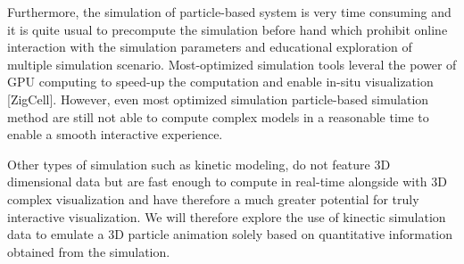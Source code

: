 Furthermore, the simulation of particle-based system is very time consuming and it is quite usual to precompute the simulation before hand which prohibit online interaction with the simulation parameters and educational exploration of multiple simulation scenario.
Most-optimized simulation tools leveral the power of GPU computing to speed-up the computation and enable in-situ visualization [ZigCell].
However, even most optimized simulation particle-based simulation method are still not able to compute complex models in a reasonable time to enable a smooth interactive experience.

Other types of simulation such as kinetic modeling, do not feature 3D dimensional data but are fast enough to compute in real-time alongside with 3D complex visualization and have therefore a much greater potential for truly interactive visualization.
We will therefore explore the use of kinectic simulation data to emulate a 3D particle animation solely based on quantitative information obtained from the simulation.


%
%
%
%
%
%
%
%
%
%
%
%
%
%
%
%



